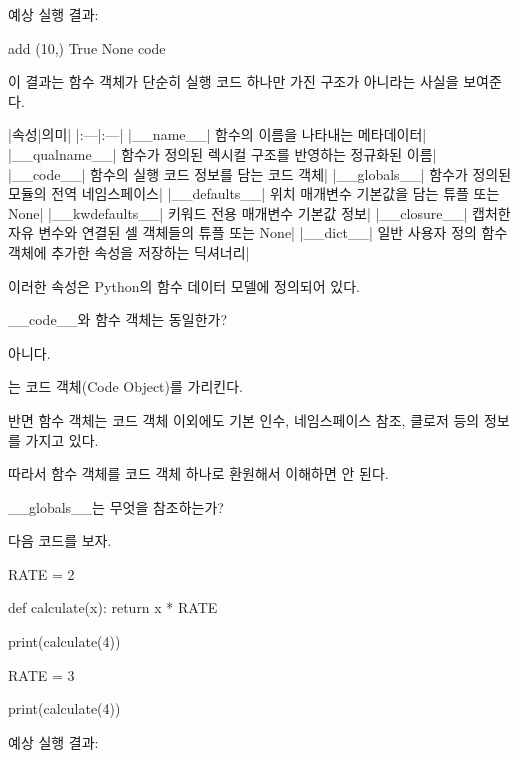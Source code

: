 예상 실행 결과:

\begin{dhkzsh}
add
(10,)
True
None
code
\end{dhkzsh}

이 결과는 함수 객체가 단순히 실행 코드 하나만 가진 구조가 아니라는 사실을 보여준다.

\begin{dhktable}
|속성|의미|
|:---|:---|
|__name__|	함수의 이름을 나타내는 메타데이터|
|__qualname__|	함수가 정의된 렉시컬 구조를 반영하는 정규화된 이름|
|__code__|	함수의 실행 코드 정보를 담는 코드 객체|
|__globals__|	함수가 정의된 모듈의 전역 네임스페이스|
|__defaults__|	위치 매개변수 기본값을 담는 튜플 또는 None|
|__kwdefaults__|	키워드 전용 매개변수 기본값 정보|
|__closure__|	캡처한 자유 변수와 연결된 셀 객체들의 튜플 또는 None|
|__dict__|	일반 사용자 정의 함수 객체에 추가한 속성을 저장하는 딕셔너리|
\end{dhktable}

이러한 속성은 Python의 함수 데이터 모델에 정의되어 있다.

\begin{dhknote}
\begin{dhksmry}[centered]
__code__와 함수 객체는 동일한가?
\end{dhksmry}
\end{dhknote}

아니다.

는 코드 객체(Code Object)를 가리킨다.

반면 함수 객체는 코드 객체 이외에도 기본 인수, 네임스페이스 참조, 클로저 등의 정보를 가지고 있다.

따라서 함수 객체를 코드 객체 하나로 환원해서 이해하면 안 된다.

\begin{dhknote}
\begin{dhksmry}[centered]
__globals__는 무엇을 참조하는가?
\end{dhksmry}
\end{dhknote}

다음 코드를 보자.

\begin{dhkcode}
RATE = 2

def calculate(x):
    return x * RATE

print(calculate(4))

RATE = 3

print(calculate(4))
\end{dhkcode}

예상 실행 결과:

